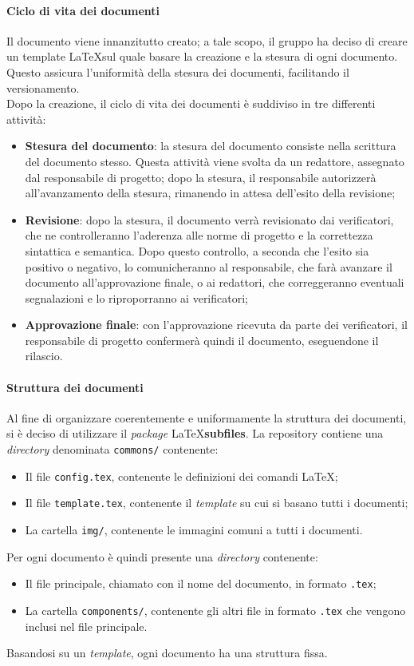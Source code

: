 \documentclass[../norme-di-progetto.tex]{subfiles}
\begin{document}
\paragraph{Ciclo di vita dei documenti}
Il documento viene innanzitutto creato; a tale scopo, il gruppo ha deciso di creare un template \LaTeX sul quale basare la creazione e la stesura di ogni documento. Questo assicura l'uniformità della stesura dei documenti, facilitando il versionamento. \\
Dopo la creazione, il ciclo di vita dei documenti è suddiviso in tre differenti attività:
\begin{itemize}
  \item \textbf{Stesura del documento}: la stesura del documento consiste nella scrittura del documento stesso. Questa attività viene svolta da un redattore, assegnato dal responsabile di progetto; dopo la stesura, il responsabile autorizzerà all'avanzamento della stesura, rimanendo in attesa dell'esito della revisione;
  \item \textbf{Revisione}: dopo la stesura, il documento verrà revisionato dai verificatori, che ne controlleranno l'aderenza alle norme di progetto e la correttezza sintattica e semantica. Dopo questo controllo, a seconda che l'esito sia positivo o negativo, lo comunicheranno al responsabile, che farà avanzare il documento all'approvazione finale, o ai  redattori, che correggeranno eventuali segnalazioni e lo riproporranno ai verificatori;
  \item \textbf{Approvazione finale}: con l'approvazione ricevuta da parte dei verificatori, il responsabile di progetto confermerà quindi il documento, eseguendone il rilascio.
\end{itemize}

\paragraph{Struttura dei documenti}
Al fine di organizzare coerentemente e uniformamente la struttura dei documenti, si è deciso di utilizzare il \textit{package} \LaTeX \textbf{subfiles}. La repository contiene una \textit{directory} denominata \texttt{commons/} contenente:
\begin{itemize}
  \item Il file \texttt{config.tex}, contenente le definizioni dei comandi \LaTeX;
  \item Il file \texttt{template.tex}, contenente il \textit{template} su cui si basano tutti i documenti;
  \item La cartella \texttt{img/}, contenente le immagini comuni a tutti i documenti.
\end{itemize}
Per ogni documento è quindi presente una \textit{directory} contenente:
\begin{itemize}
  \item  Il file principale, chiamato con il nome del documento, in formato \texttt{.tex};
  \item La cartella \texttt{components/}, contenente gli altri file in formato \texttt{.tex} che vengono inclusi nel file principale.
\end{itemize}
Basandosi su un \textit{template}, ogni documento ha una struttura fissa.
\end{document}

